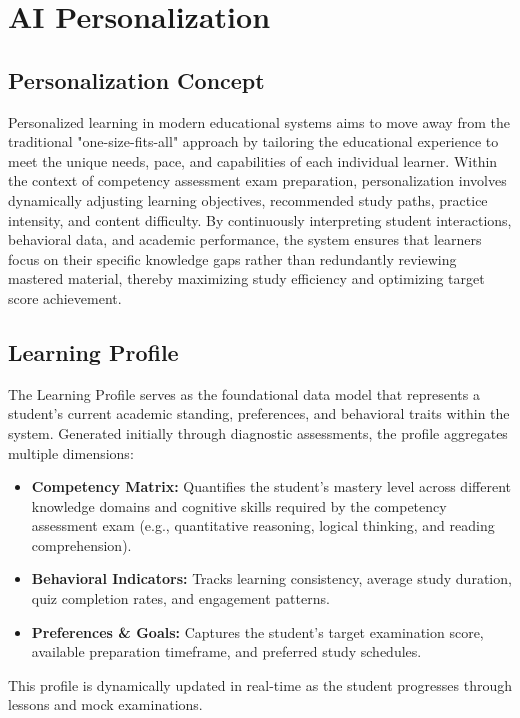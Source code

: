 \chapter{AI Personalization}
\section{Personalization Concept}

Personalized learning in modern educational systems aims to move away from the traditional "one-size-fits-all" approach by tailoring the educational experience to meet the unique needs, pace, and capabilities of each individual learner. Within the context of competency assessment exam preparation, personalization involves dynamically adjusting learning objectives, recommended study paths, practice intensity, and content difficulty. By continuously interpreting student interactions, behavioral data, and academic performance, the system ensures that learners focus on their specific knowledge gaps rather than redundantly reviewing mastered material, thereby maximizing study efficiency and optimizing target score achievement.

\section{Learning Profile}

The Learning Profile serves as the foundational data model that represents a student's current academic standing, preferences, and behavioral traits within the system. Generated initially through diagnostic assessments, the profile aggregates multiple dimensions:

\begin{itemize}
	\item \textbf{Competency Matrix:} Quantifies the student's mastery level across different knowledge domains and cognitive skills required by the competency assessment exam (e.g., quantitative reasoning, logical thinking, and reading comprehension).
	\item \textbf{Behavioral Indicators:} Tracks learning consistency, average study duration, quiz completion rates, and engagement patterns.
	\item \textbf{Preferences \& Goals:} Captures the student's target examination score, available preparation timeframe, and preferred study schedules.
\end{itemize}

This profile is dynamically updated in real-time as the student progresses through lessons and mock examinations.

